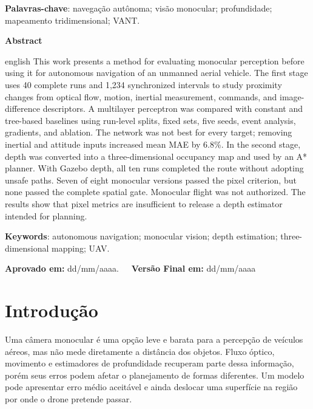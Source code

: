 \documentclass[article,a4paper,12pt,brazil,sumario=tradicional]{abntex2}
\begin{document}
\vspace{.4cm}
 
\noindent
\textbf{Palavras-chave}: navegação autônoma; visão monocular; profundidade; mapeamento tridimensional; VANT.
 
\vspace{\onelineskip}

\begin{center}
    \textbf{Abstract}
\end{center}

\vspace{-.3cm}
\begin{hyphenrules}{english}
\noindent
This work presents a method for evaluating monocular perception before using it for autonomous navigation of an unmanned aerial vehicle. The first stage uses 40 complete runs and 1,234 synchronized intervals to study proximity changes from optical flow, motion, inertial measurement, commands, and image-difference descriptors. A multilayer perceptron was compared with constant and tree-based baselines using run-level splits, fixed sets, five seeds, event analysis, gradients, and ablation. The network was not best for every target; removing inertial and attitude inputs increased mean MAE by 6.8\%. In the second stage, depth was converted into a three-dimensional occupancy map and used by an A* planner. With Gazebo depth, all ten runs completed the route without adopting unsafe paths. Seven of eight monocular versions passed the pixel criterion, but none passed the complete spatial gate. Monocular flight was not authorized. The results show that pixel metrics are insufficient to release a depth estimator intended for planning.
\end{hyphenrules}
\vspace{.4cm}
 
\noindent \textbf{Keywords}: autonomous navigation; monocular vision; depth estimation; three-dimensional mapping; UAV.

\vspace{.4cm}

\noindent \textbf{Aprovado em:} dd/mm/aaaa.~~~\textbf{Versão Final em:} dd/mm/aaaa

\section{Introdução}

Uma câmera monocular é uma opção leve e barata para a percepção de veículos aéreos, mas não mede diretamente a distância dos objetos. Fluxo óptico, movimento e estimadores de profundidade recuperam parte dessa informação, porém seus erros podem afetar o planejamento de formas diferentes. Um modelo pode apresentar erro médio aceitável e ainda deslocar uma superfície na região por onde o drone pretende passar.
\end{document}
